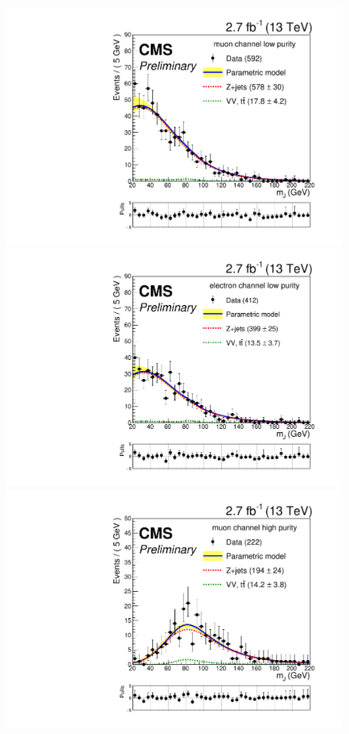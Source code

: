 \begin{figure}[p]
\begin{center}
\includegraphics[scale=0.35]{figures/fits/mjFitMLP.pdf}
\includegraphics[scale=0.35]{figures/fits/mjFitELP.pdf}\\
\includegraphics[scale=0.35]{figures/fits/mjFitMHP.pdf}

\end{center}
\end{figure}

